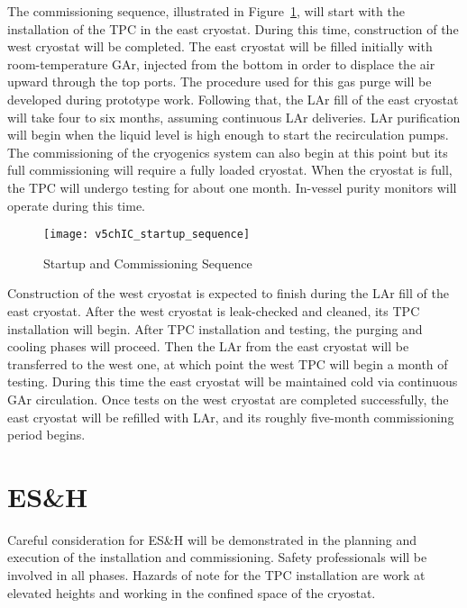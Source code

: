 The commissioning sequence, illustrated in Figure~\ref{fig:startup_sequence}, will start with the installation of the TPC in the east cryostat. During this time, construction of the west cryostat will be 
completed.  The east cryostat will be filled initially with room-temperature GAr, injected from the bottom 
in order to displace the air upward through the top ports. The procedure used for this gas purge will be developed during prototype work. Following that, the LAr fill of the east cryostat will take four to six months, 
assuming continuous LAr deliveries.  LAr purification will begin when the liquid level is high enough to start the recirculation pumps. The commissioning of the cryogenics system can also begin at this point but its full commissioning will require a fully loaded cryostat. When the cryostat is full, the TPC will undergo testing for about one month. In-vessel purity monitors will operate during this time.

\begin{figure}[htpb]
\centering
\texttt{[image: v5chIC\_startup\_sequence]}
\caption{Startup and Commissioning Sequence}
\label{fig:startup_sequence}
\end{figure}

Construction of the west cryostat is expected to finish during the LAr fill of the east cryostat. After the west cryostat is leak-checked and cleaned, its TPC installation will begin. After TPC installation and testing, the purging and cooling phases will proceed. Then the LAr from the east cryostat will be transferred to the west one, at which point the west TPC will begin a month of testing. During this time the east cryostat will be maintained cold via continuous GAr circulation. Once tests on the west cryostat are completed successfully, the east cryostat will be refilled with LAr, and its roughly five-month commissioning period begins. 

\section{ES\&H}

Careful consideration for ES\&H will be demonstrated in the planning and execution of the installation and commissioning. Safety professionals will be involved in all phases. Hazards of note for the TPC installation are work at elevated heights and working in the confined space of the cryostat. 

